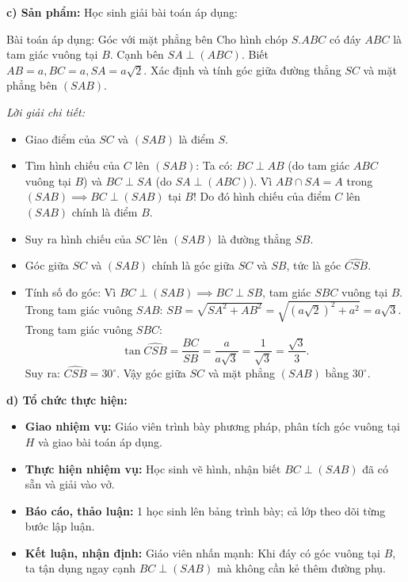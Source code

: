 \documentclass[12pt, a4paper]{article}
\begin{document}
\noindent \textbf{c) Sản phẩm:}
Học sinh giải bài toán áp dụng:
\begin{pedabox}{Bài toán áp dụng: Góc với mặt phẳng bên}
Cho hình chóp $S.ABC$ có đáy $ABC$ là tam giác vuông tại $B$. Cạnh bên $SA \perp (ABC)$. Biết $AB = a, BC = a, SA = a\sqrt{2}$.
Xác định và tính góc giữa đường thẳng $SC$ và mặt phẳng bên $(SAB)$.
\end{pedabox}
\textit{Lời giải chi tiết:}
\begin{itemize}
    \item Giao điểm của $SC$ và $(SAB)$ là điểm $S$.
    \item Tìm hình chiếu của $C$ lên $(SAB)$:
    Ta có: $BC \perp AB$ (do tam giác $ABC$ vuông tại $B$) và $BC \perp SA$ (do $SA \perp (ABC)$).
    Vì $AB \cap SA = A$ trong $(SAB) \implies BC \perp (SAB)$ tại $B$!
    Do đó hình chiếu của điểm $C$ lên $(SAB)$ chính là điểm $B$.
    \item Suy ra hình chiếu của $SC$ lên $(SAB)$ là đường thẳng $SB$.
    \item Góc giữa $SC$ và $(SAB)$ chính là góc giữa $SC$ và $SB$, tức là góc $\widehat{CSB}$.
    \item Tính số đo góc:
    Vì $BC \perp (SAB) \implies BC \perp SB$, tam giác $SBC$ vuông tại $B$.
    Trong tam giác vuông $SAB$: $SB = \sqrt{SA^2 + AB^2} = \sqrt{(a\sqrt{2})^2 + a^2} = a\sqrt{3}$.
    Trong tam giác vuông $SBC$:
    $$\tan \widehat{CSB} = \dfrac{BC}{SB} = \dfrac{a}{a\sqrt{3}} = \dfrac{1}{\sqrt{3}} = \dfrac{\sqrt{3}}{3}.$$
    Suy ra: $\widehat{CSB} = 30^\circ$.
    Vậy góc giữa $SC$ và mặt phẳng $(SAB)$ bằng $30^\circ$.
\end{itemize}

\noindent \textbf{d) Tổ chức thực hiện:}
\begin{itemize}[leftmargin=0.6cm]
    \item \textbf{Giao nhiệm vụ:} Giáo viên trình bày phương pháp, phân tích góc vuông tại $H$ và giao bài toán áp dụng.
    \item \textbf{Thực hiện nhiệm vụ:} Học sinh vẽ hình, nhận biết $BC \perp (SAB)$ đã có sẵn và giải vào vở.
    \item \textbf{Báo cáo, thảo luận:} 1 học sinh lên bảng trình bày; cả lớp theo dõi từng bước lập luận.
    \item \textbf{Kết luận, nhận định:} Giáo viên nhấn mạnh: Khi đáy có góc vuông tại $B$, ta tận dụng ngay cạnh $BC \perp (SAB)$ mà không cần kẻ thêm đường phụ.
\end{itemize}
\end{document}
